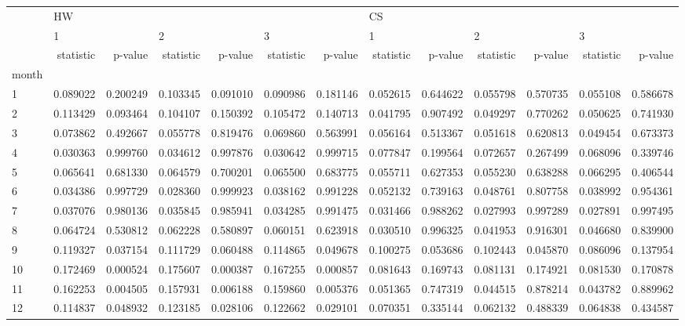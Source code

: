 \begin{tabular}{lrrrrrrrrrrrr}
\toprule
{} & \multicolumn{6}{l}{HW} & \multicolumn{6}{l}{CS} \\
{} & \multicolumn{2}{l}{1} & \multicolumn{2}{l}{2} & \multicolumn{2}{l}{3} & \multicolumn{2}{l}{1} & \multicolumn{2}{l}{2} & \multicolumn{2}{l}{3} \\
{} & statistic &   p-value & statistic &   p-value & statistic &   p-value & statistic &   p-value & statistic &   p-value & statistic &   p-value \\
month &           &           &           &           &           &           &           &           &           &           &           &           \\
\midrule
1     &  0.089022 &  0.200249 &  0.103345 &  0.091010 &  0.090986 &  0.181146 &  0.052615 &  0.644622 &  0.055798 &  0.570735 &  0.055108 &  0.586678 \\
2     &  0.113429 &  0.093464 &  0.104107 &  0.150392 &  0.105472 &  0.140713 &  0.041795 &  0.907492 &  0.049297 &  0.770262 &  0.050625 &  0.741930 \\
3     &  0.073862 &  0.492667 &  0.055778 &  0.819476 &  0.069860 &  0.563991 &  0.056164 &  0.513367 &  0.051618 &  0.620813 &  0.049454 &  0.673373 \\
4     &  0.030363 &  0.999760 &  0.034612 &  0.997876 &  0.030642 &  0.999715 &  0.077847 &  0.199564 &  0.072657 &  0.267499 &  0.068096 &  0.339746 \\
5     &  0.065641 &  0.681330 &  0.064579 &  0.700201 &  0.065500 &  0.683775 &  0.055711 &  0.627353 &  0.055230 &  0.638288 &  0.066295 &  0.406544 \\
6     &  0.034386 &  0.997729 &  0.028360 &  0.999923 &  0.038162 &  0.991228 &  0.052132 &  0.739163 &  0.048761 &  0.807758 &  0.038992 &  0.954361 \\
7     &  0.037076 &  0.980136 &  0.035845 &  0.985941 &  0.034285 &  0.991475 &  0.031466 &  0.988262 &  0.027993 &  0.997289 &  0.027891 &  0.997495 \\
8     &  0.064724 &  0.530812 &  0.062228 &  0.580897 &  0.060151 &  0.623918 &  0.030510 &  0.996325 &  0.041953 &  0.916301 &  0.046680 &  0.839900 \\
9     &  0.119327 &  0.037154 &  0.111729 &  0.060488 &  0.114865 &  0.049678 &  0.100275 &  0.053686 &  0.102443 &  0.045870 &  0.086096 &  0.137954 \\
10    &  0.172469 &  0.000524 &  0.175607 &  0.000387 &  0.167255 &  0.000857 &  0.081643 &  0.169743 &  0.081131 &  0.174921 &  0.081530 &  0.170878 \\
11    &  0.162253 &  0.004505 &  0.157931 &  0.006188 &  0.159860 &  0.005376 &  0.051365 &  0.747319 &  0.044515 &  0.878214 &  0.043782 &  0.889962 \\
12    &  0.114837 &  0.048932 &  0.123185 &  0.028106 &  0.122662 &  0.029101 &  0.070351 &  0.335144 &  0.062132 &  0.488339 &  0.064838 &  0.434587 \\
\bottomrule
\end{tabular}
